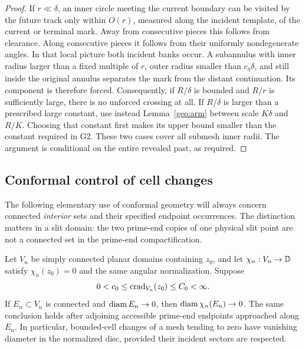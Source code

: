 \begin{proof}
If \(r\ll\delta\), an inner circle meeting the current boundary can be
visited by the future track only within \(O(r)\), measured along the
incident template, of the current or terminal mark. Away from
consecutive pieces this follows from clearance. Along consecutive
pieces it follows from their uniformly nondegenerate angles. In that
local picture both incident banks occur. A subannulus with inner radius
larger than a fixed multiple of \(r\), outer radius smaller than
\(c_\eta\delta\), and still inside the original annulus separates the
mark from the distant continuation. Its component is therefore forced.
Consequently, if \(R/\delta\) is bounded and \(R/r\) is sufficiently
large, there is no unforced crossing at all. If \(R/\delta\) is larger
than a prescribed large constant, use instead
Lemma~\ref{geo:arm} between scale \(K\delta\) and \(R/K\).
Choosing that constant first makes its upper bound smaller than the
constant required in G2. These two cases cover all submesh inner radii.
The argument is conditional on the entire revealed past, as required.
\end{proof}

\subsection{Conformal control of cell changes}

The following elementary use of conformal geometry will always concern
connected \emph{interior} sets and their specified endpoint occurrences.
The distinction matters in a slit domain: the two prime-end copies of
one physical slit point are not a connected set in the prime-end
compactification.

\begin{lemma}
\label{geo:crosscut}
Let \(V_n\) be simply connected planar domains containing \(z_0\), and
let \(\chi_n:V_n\to\mathbb D\) satisfy
\(\chi_n(z_0)=0\) and the same angular normalization. Suppose
\[
 0<c_0\le \operatorname{crad}_{V_n}(z_0)\le C_0<\infty.
\]
If \(E_n\subset V_n\) is connected and
\(\operatorname{diam} E_n\to0\), then \(\operatorname{diam}\chi_n(E_n)\to0\).
The same conclusion holds after adjoining accessible prime-end
endpoints approached along \(E_n\).
In particular, bounded-cell changes of a mesh tending to zero have
vanishing diameter in the normalized disc, provided their incident
sectors are respected.
\end{lemma}

